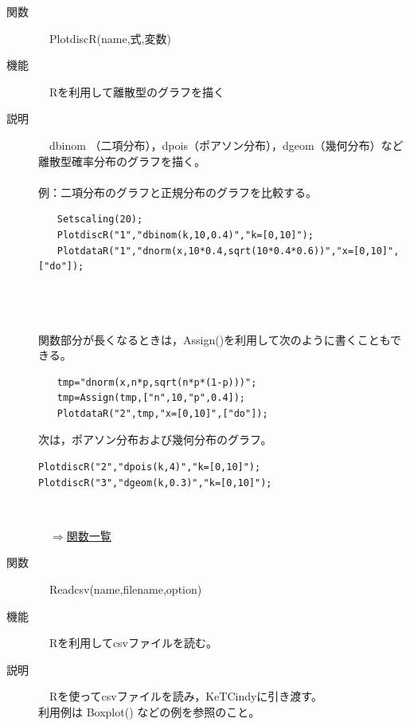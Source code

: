 \documentclass[papersize,a4paper,12pt,uplatex]{jsarticle}
\begin{document}
\begin{description}
\hypertarget{plotdiscr}{}
\item[関数]　PlotdiscR(name,式,変数)
\item[機能]　Rを利用して離散型のグラフを描く
\item[説明]　dbinom （二項分布），dpois（ポアソン分布），dgeom（幾何分布）など離散型確率分布のグラフを描く。\\
　\\
例：二項分布のグラフと正規分布のグラフを比較する。
\begin{verbatim}
　　Setscaling(20);
　　PlotdiscR("1","dbinom(k,10,0.4)","k=[0,10]");
　　PlotdataR("1","dnorm(x,10*0.4,sqrt(10*0.4*0.6))","x=[0,10]",["do"]);
\end{verbatim}
　\\
　　\\
　\\
関数部分が長くなるときは，Assign()を利用して次のように書くこともできる。
\begin{verbatim}
　　tmp="dnorm(x,n*p,sqrt(n*p*(1-p)))";
　　tmp=Assign(tmp,["n",10,"p",0.4]);
　　PlotdataR("2",tmp,"x=[0,10]",["do"]);
\end{verbatim}

次は，ポアソン分布および幾何分布のグラフ。
\begin{verbatim}
PlotdiscR("2","dpois(k,4)","k=[0,10]");
PlotdiscR("3","dgeom(k,0.3)","k=[0,10]");
\end{verbatim}
　\\
\begin{flushright}　\hyperlink{functionlist}{$\Rightarrow$関数一覧}\end{flushright}

\hypertarget{readcsv}{}
\item[関数]　Readcsv(name,filename,option)
\item[機能]　Rを利用してcsvファイルを読む。
\item[説明]　Rを使ってcsvファイルを読み，KeTCindyに引き渡す。\\
利用例は Boxplot() などの例を参照のこと。\\
　\\


\end{description}
\end{document}

